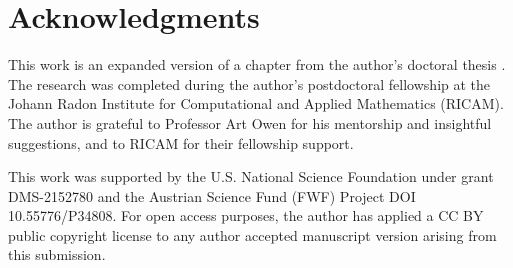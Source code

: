 \documentclass{article}
\theoremstyle{definition}
\begin{document}
\section*{Acknowledgments}

This work is an expanded version of a chapter from the author's doctoral thesis \cite{mythesis}. The research was completed during the author's postdoctoral fellowship at the Johann Radon Institute for Computational and Applied Mathematics (RICAM). The author is grateful to Professor Art Owen for his mentorship and insightful suggestions, and to RICAM for their fellowship support. 

This work was supported by the U.S. National Science Foundation under grant DMS-2152780 and the Austrian Science Fund (FWF) 
Project DOI 10.55776/P34808. For open access purposes, the author has 
applied a CC BY public copyright license to any author accepted 
manuscript version arising from this submission.


\appendix
\end{document}
